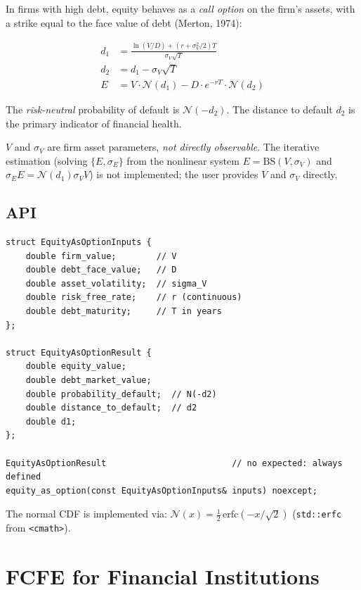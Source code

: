 \documentclass[12pt, a4paper, oneside]{book}
\begin{document}
In firms with high debt, equity behaves as a \emph{call option} on the firm's
assets, with a strike equal to the face value of debt (Merton, 1974):

\begin{align}
  d_1 &= \frac{\ln(V/D) + (r + \sigma_V^2/2)T}{\sigma_V \sqrt{T}} \\[4pt]
  d_2 &= d_1 - \sigma_V \sqrt{T} \\[4pt]
  E   &= V \cdot \mathcal{N}(d_1) - D \cdot e^{-rT} \cdot \mathcal{N}(d_2)
  \label{eq:merton}
\end{align}

The \emph{risk-neutral} probability of default is $\mathcal{N}(-d_2)$.
The distance to default $d_2$ is the primary indicator of financial health.

\begin{warning}
$V$ and $\sigma_V$ are firm asset parameters, \emph{not directly observable}.
The iterative estimation (solving $\{E, \sigma_E\}$ from the nonlinear system
$E = \text{BS}(V, \sigma_V)$ and $\sigma_E E = \mathcal{N}(d_1) \sigma_V V$)
is not implemented; the user provides $V$ and $\sigma_V$ directly.
\end{warning}

\subsection{API}

\begin{lstlisting}[style=cpp]
struct EquityAsOptionInputs {
    double firm_value;        // V
    double debt_face_value;   // D
    double asset_volatility;  // sigma_V
    double risk_free_rate;    // r (continuous)
    double debt_maturity;     // T in years
};

struct EquityAsOptionResult {
    double equity_value;
    double debt_market_value;
    double probability_default;  // N(-d2)
    double distance_to_default;  // d2
    double d1;
};

EquityAsOptionResult                         // no expected: always defined
equity_as_option(const EquityAsOptionInputs& inputs) noexcept;
\end{lstlisting}

The normal CDF is implemented via:
$\mathcal{N}(x) = \tfrac{1}{2}\,\mathrm{erfc}\!\left(-x/\sqrt{2}\right)$
(\texttt{std::erfc} from \texttt{<cmath>}).

\section{FCFE for Financial Institutions}
\end{document}
